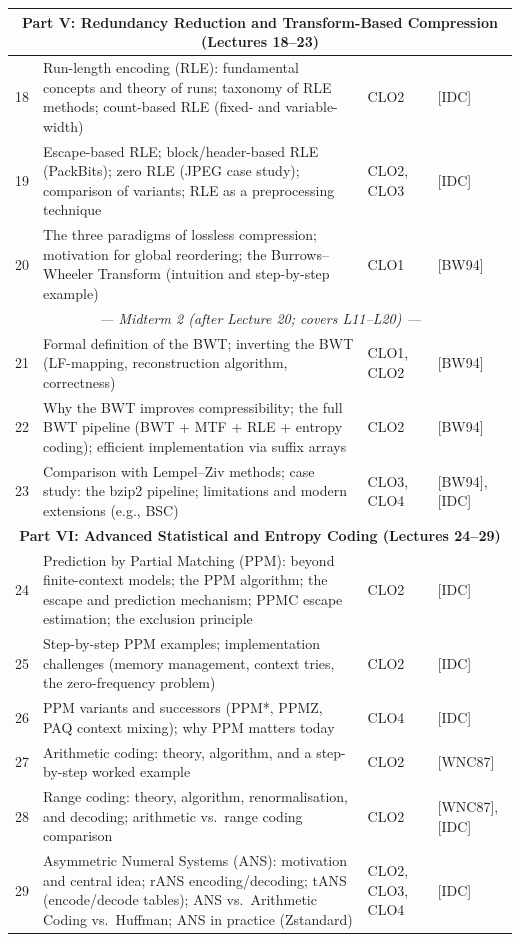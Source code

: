 \documentclass{article}
\begin{document}
\begin{longtable}{|c|p{8.7cm}|p{1.6cm}|p{2.6cm}|}
\multicolumn{4}{|c|}{\cellcolor{gray!20}\textbf{Part V: Redundancy Reduction and Transform-Based Compression (Lectures 18--23)}} \\ \hline
18 & Run-length encoding (RLE): fundamental concepts and theory of runs; taxonomy of RLE methods; count-based RLE (fixed- and variable-width) & CLO2 & [IDC] \\ \hline
19 & Escape-based RLE; block/header-based RLE (PackBits); zero RLE (JPEG case study); comparison of variants; RLE as a preprocessing technique & CLO2, CLO3 & [IDC] \\ \hline
20 & The three paradigms of lossless compression; motivation for global reordering; the Burrows--Wheeler Transform (intuition and step-by-step example) & CLO1 & [BW94] \\ \hline
\multicolumn{4}{|c|}{\cellcolor{yellow!25}\textit{--- Midterm 2 (after Lecture 20; covers L11--L20) ---}} \\ \hline
21 & Formal definition of the BWT; inverting the BWT (LF-mapping, reconstruction algorithm, correctness) & CLO1, CLO2 & [BW94] \\ \hline
22 & Why the BWT improves compressibility; the full BWT pipeline (BWT + MTF + RLE + entropy coding); efficient implementation via suffix arrays & CLO2 & [BW94] \\ \hline
23 & Comparison with Lempel--Ziv methods; case study: the bzip2 pipeline; limitations and modern extensions (e.g., BSC) & CLO3, CLO4 & [BW94], [IDC] \\ \hline

\multicolumn{4}{|c|}{\cellcolor{gray!20}\textbf{Part VI: Advanced Statistical and Entropy Coding (Lectures 24--29)}} \\ \hline
24 & Prediction by Partial Matching (PPM): beyond finite-context models; the PPM algorithm; the escape and prediction mechanism; PPMC escape estimation; the exclusion principle & CLO2 & [IDC] \\ \hline
25 & Step-by-step PPM examples; implementation challenges (memory management, context tries, the zero-frequency problem) & CLO2 & [IDC] \\ \hline
26 & PPM variants and successors (PPM*, PPMZ, PAQ context mixing); why PPM matters today & CLO4 & [IDC] \\ \hline
27 & Arithmetic coding: theory, algorithm, and a step-by-step worked example & CLO2 & [WNC87] \\ \hline
28 & Range coding: theory, algorithm, renormalisation, and decoding; arithmetic vs.\ range coding comparison & CLO2 & [WNC87], [IDC] \\ \hline
29 & Asymmetric Numeral Systems (ANS): motivation and central idea; rANS encoding/decoding; tANS (encode/decode tables); ANS vs.\ Arithmetic Coding vs.\ Huffman; ANS in practice (Zstandard) & CLO2, CLO3, CLO4 & [IDC] \\ \hline


\end{longtable}
\end{document}

